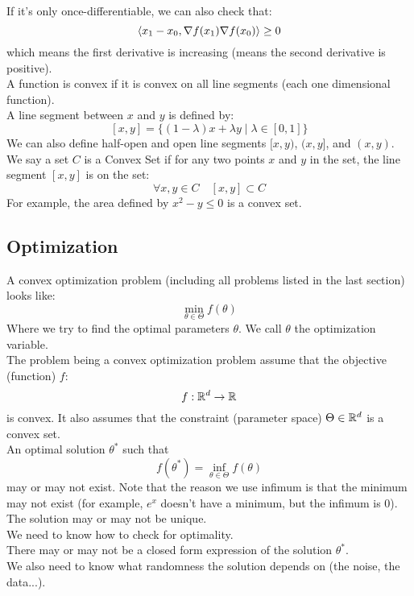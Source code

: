 \documentclass[12pt]{article}
\begin{document}
If it's only once-differentiable, we can also
check that:
\[ \left\langle x_1 - x_0, \nabla f(x_1) \nabla f(x_0) \right\rangle \geq 0 \]
which means the first derivative is increasing
(means the second derivative is positive). \\

A function is convex if it is convex on all line segments
(each one dimensional function). \\

A line segment between $x$ and $y$ is defined by:
\[ [x, y] = \{(1-\lambda)x + \lambda y 
\mid \lambda \in [0, 1] \} \]
We can also define half-open and open line segments
$[x, y)$, $(x, y]$, and $(x, y)$. \\

We say a set $C$ is a Convex Set if for any two
points $x$ and $y$ in the set, the line segment
$[x, y]$ is on the set:
\[ \forall x, y \in C \quad [x, y] \subset C \]
For example, the area defined by $x^2 - y \leq 0$
is a convex set. \\

\newpage

\subsection*{Optimization}

A convex optimization problem (including all problems
listed in the last section) looks like:
\[ \min_{\theta \in \Theta} f(\theta) \]
Where we try to find the optimal parameters $\theta$.
We call $\theta$ the optimization variable. \\

The problem being a convex optimization problem
assume that the objective (function) $f$:
\[ f: \mathbb{R}^d \to \mathbb{R} \]
is convex.
It also assumes that the constraint (parameter space)
$\Theta \in \mathbb{R}^d$ is a convex set. \\

An optimal solution $\theta^*$ such that
\[ f(\theta^*) = \inf_{\theta \in \Theta} f(\theta) \]
may or may not exist. 
Note that the reason we use infimum is that the
minimum may not exist (for example, $e^x$
doesn't have a minimum, but the infimum is $0$). \\
The solution may or may not be unique. \\
We need to know how to check for optimality. \\
There may or may not be a 
closed form expression of the solution $\theta^*$. \\
We also need to know what randomness the solution depends
on (the noise, the data...). \\
\end{document}
